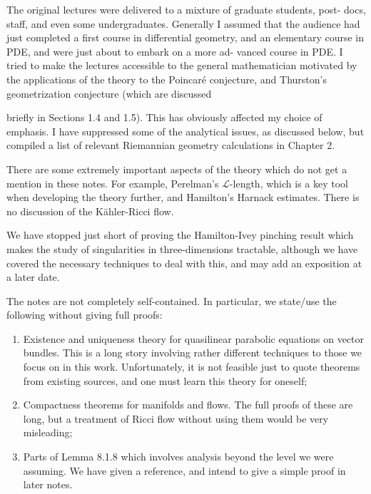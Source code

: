 The original lectures were delivered to a mixture of graduate students, post-
docs, staff, and even some undergraduates. Generally I assumed that the
audience had just completed a first course in differential geometry, and an
elementary course in PDE, and were just about to embark on a more ad-
vanced course in PDE. I tried to make the lectures accessible to the general
mathematician motivated by the applications of the theory to the Poincaré
conjecture, and Thurston’s geometrization conjecture (which are discussed

briefly in Sections 1.4 and 1.5). This has obviously affected my choice of
emphasis. I have suppressed some of the analytical issues, as discussed below,
but compiled a list of relevant Riemannian geometry calculations in Chapter 2.

There are some extremely important aspects of the theory which do not get a
mention in these notes. For example, Perelman's $\mathcal{L}$-length, which is a key
tool when developing the theory further, and Hamilton's Harnack estimates.
There is no discussion of the K\"ahler-Ricci flow.

We have stopped just short of proving the Hamilton-Ivey pinching result
which makes the study of singularities in three-dimensions tractable, although
we have covered the necessary techniques to deal with this, and may add an
exposition at a later date.

The notes are not completely self-contained. In particular, we state/use the
following without giving full proofs:

\begin{enumerate}
\item[(i)] Existence and uniqueness theory for quasilinear parabolic equations
on vector bundles. This is a long story involving rather different techniques to
those we focus on in this work. Unfortunately, it is not feasible just to quote
theorems from existing sources, and one must learn this theory for oneself;

\item[(ii)] Compactness theorems for manifolds and flows. The full proofs of
these are long, but a treatment of Ricci flow without using them would be very
misleading;

\item[(iii)] Parts of Lemma 8.1.8 which involves analysis beyond the level we were
assuming. We have given a reference, and intend to give a simple proof in later
notes.
\end{enumerate}


